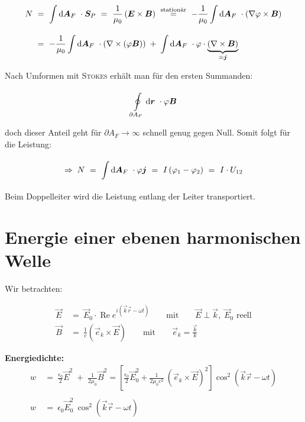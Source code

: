 \begin{enumerate}
\begin{align*}
N \ &= \ \int\limits_{{}}^{{}}\mathrm{d}{\bm{A}_F}\  \cdot \bm{S}_P \ = \ \frac{1}{\mu_0} \left(\bm{E}\times\bm{B}\right) \ \overset{\text{stationär}}{=} \ - \frac{1}{\mu_0} \int\limits_{{}}^{{}}\mathrm{d}{\bm{A}_F}\  \cdot \left(\nabla \varphi \times \bm{B}\right)\\
&= \ - \frac{1}{\mu_0} \int\limits_{{}}^{{}}\mathrm{d}{\bm{A}_F}\  \cdot \left(\nabla\times\left(\varphi\bm{B}\right)\right) \; + \; \int\limits_{{}}^{{}}\mathrm{d}{\bm{A}_F}\ \cdot\varphi\cdot\underbrace{\left(\nabla\times\bm{B}\right)}_{=\bm{j}}
\end{align*}

Nach Umformen mit \textsc{Stokes} erhält man für den ersten Summanden:

\begin{equation*}
\oint\limits_{{\partial A_F}}^{{}}\mathrm{d}{\bm{r}}\   \cdot \varphi \bm{B}
\end{equation*}

doch dieser Anteil geht für $\partial A_F \rightarrow \infty$ schnell genug gegen Null. Somit folgt für die Leistung:

\begin{equation*}
\Rightarrow \; N \ = \ \Int{}{}{\vec{A}_F} \cdot \varphi \vec{j} \ = \ I \left(\varphi_1 - \varphi_2 \right) \ = \ I \cdot U_{12}
\end{equation*}
Beim Doppelleiter wird die Leistung entlang der Leiter transportiert.
\end{enumerate}


\section{Energie einer ebenen harmonischen Welle}

Wir betrachten:

\begin{align*}
\vec{E} \ &= \ \vec{E}_0 \cdot \operatorname{Re} e^{i\left(\vec{k}\vec{r}-\omega t\right)} \qquad \text{mit} \qquad \vec{E}\perp\vec{k}, \; \vec{E}_0 \text{ reell}\\
\vec{B} \ &= \ \frac{1}{c}\left(\vec{e}_k\times\vec{E}\right) \qquad \text{mit} \qquad \vec{e}_k = \frac{\vec{k}}{k}
\end{align*}

\textbf{Energiedichte:}\\

\begin{align*}
w \ &= \ \frac{\epsilon_0}{2} \vec{E}^2 \; + \; \frac{1}{2\mu_0}\vec{B}^2 = \left[\frac{\epsilon_0}{2}\vec{E}_0^2 + \frac{1}{2\mu_0 c^2} \ \left(\vec{e}_k\times\vec{E}\right)^2\right] \cos^2\left(\vec{k}\vec{r}-\omega t\right)\\
\ \\
w \ &= \ \epsilon_0 \vec{E}_0^2 \ \cos^2\left(\vec{k}\vec{r}-\omega t\right)
\end{align*}

